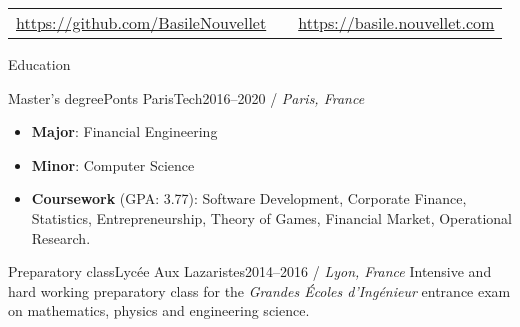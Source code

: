 \documentclass[]{mcdowellcv}
\begin{document}
    \makeheader

    \begin{tabu}
        to 1\textwidth { X[2,l,p] X[c,p] X[2,r,p] }
        {\small \url{https://github.com/BasileNouvellet}} & \textbf{} & {\small \url{https://basile.nouvellet.com}} \\
    \end{tabu}

    \begin{cvsection}{Education}

        \begin{cvsubsection}{Master's degree}{Ponts ParisTech}{2016--2020 / \textit{Paris, France}}
            \begin{itemize}
                \item \textbf{Major}: Financial Engineering
                \item \textbf{Minor}: Computer Science
                \item \textbf{Coursework} (GPA: 3.77): Software Development, Corporate Finance, Statistics, Entrepreneurship, Theory of Games, Financial Market, Operational Research.
            \end{itemize}
        \end{cvsubsection}

        \begin{cvsubsection}{Preparatory class}{Lyc\'ee Aux Lazaristes}{2014--2016 / \textit{Lyon, France}}
            Intensive and hard working preparatory class for the \textit{Grandes \'Ecoles d'Ing\'enieur} entrance exam on mathematics, physics and engineering science.
        \end{cvsubsection}

    \end{cvsection}
\end{document}
